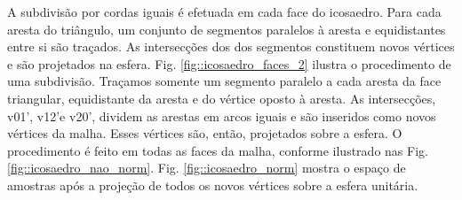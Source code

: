 \documentclass[
    12pt,                %
    oneside,            %
    a4paper,            %
    english,            %
    french,                %
    spanish,            %
    brazil                %
    ]{abntex2}
\begin{document}
A subdivisão por cordas iguais é efetuada em cada face do icosaedro. Para cada aresta do triângulo, um conjunto de segmentos paralelos à aresta e equidistantes entre si são traçados. As intersecções dos dos segmentos constituem novos vértices e são projetados na esfera. Fig. \ref{fig::icosaedro_faces_2} ilustra o procedimento de uma subdivisão. Traçamos somente um segmento paralelo a cada aresta da face triangular, equidistante da aresta e do vértice oposto à aresta. As intersecções, v01', v12'e v20', dividem as arestas em arcos iguais e são inseridos como novos vértices da malha. Esses vértices são, então, projetados sobre a esfera. O procedimento é feito em todas as faces da malha, conforme ilustrado nas Fig.\ref{fig::icosaedro_nao_norm}. Fig. \ref{fig::icosaedro_norm} mostra o espaço de amostras após a projeção de todos os novos vértices sobre a esfera unitária.
\end{document}
